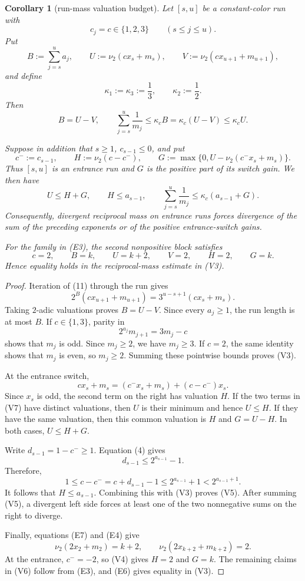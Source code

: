 \documentclass[11pt]{article}
\newtheorem{corollary}[theorem]{Corollary}
\begin{document}
\begin{corollary}[run-mass valuation budget]
Let $[s,u]$ be a constant-color run with
\[
  c_j=c\in\{1,2,3\}
  \qquad(s\leq j\leq u).
\]
Put
\[
  B:=\sum_{j=s}^{u}a_j,
  \qquad
  U:=\nu_2(cx_s+m_s),
  \qquad
  V:=\nu_2(cx_{u+1}+m_{u+1}),
  \tag{V1}
\]
and define
\[
  \kappa_1:=\kappa_3:=\frac13,
  \qquad
  \kappa_2:=\frac12.
  \tag{V2}
\]
Then
\[
\boxed{
  B=U-V,
  \qquad
  \sum_{j=s}^{u}\frac1{m_j}
  \leq\kappa_cB
  =\kappa_c(U-V)
  \leq\kappa_cU.}
\tag{V3}
\]

Suppose in addition that $s\geq1$, $c_{s-1}\leq0$, and put
\[
  c^-:=c_{s-1},
  \qquad
  H:=\nu_2(c-c^-),
  \qquad
  G:=\max\{0,U-\nu_2(c^-x_s+m_s)\}.
  \tag{V4}
\]
Thus $[s,u]$ is an entrance run and $G$ is the positive part of its
switch gain.  We then have
\[
\boxed{
  U\leq H+G,
  \qquad
  H\leq a_{s-1},
  \qquad
  \sum_{j=s}^{u}\frac1{m_j}
  \leq\kappa_c(a_{s-1}+G).}
\tag{V5}
\]
Consequently, divergent reciprocal mass on entrance runs forces divergence
of the sum of the preceding exponents or of the positive entrance-switch
gains.

For the family in (E3), the second nonpositive block satisfies
\[
  c=2,
  \qquad
  B=k,
  \qquad
  U=k+2,
  \qquad
  V=2,
  \qquad
  H=2,
  \qquad
  G=k.
  \tag{V6}
\]
Hence equality holds in the reciprocal-mass estimate in (V3).
\end{corollary}

\begin{proof}
Iteration of (11) through the run gives
\[
  2^B(cx_{u+1}+m_{u+1})
  =3^{u-s+1}(cx_s+m_s).
\]
Taking $2$-adic valuations proves $B=U-V$.  Since every $a_j\geq1$, the
run length is at most $B$.  If $c\in\{1,3\}$, parity in
\[
  2^{a_j}m_{j+1}=3m_j-c
\]
shows that $m_j$ is odd.  Since $m_j\geq2$, we have $m_j\geq3$.  If
$c=2$, the same identity shows that $m_j$ is even, so $m_j\geq2$.
Summing these pointwise bounds proves (V3).

At the entrance switch,
\[
  cx_s+m_s=(c^-x_s+m_s)+(c-c^-)x_s.
  \tag{V7}
\]
Since $x_s$ is odd, the second term on the right has valuation $H$.  If
the two terms in (V7) have distinct valuations, then $U$ is their minimum
and hence $U\leq H$.  If they have the same valuation, then this common
valuation is $H$ and $G=U-H$.  In both cases, $U\leq H+G$.

Write $d_{s-1}=1-c^-\geq1$.  Equation (4) gives
\[
  d_{s-1}\leq2^{a_{s-1}}-1.
\]
Therefore,
\[
  1\leq c-c^-=c+d_{s-1}-1\leq2^{a_{s-1}}+1<2^{a_{s-1}+1}.
\]
It follows that $H\leq a_{s-1}$.  Combining this with (V3) proves (V5).
After summing (V5), a divergent left side forces at least one of the two
nonnegative sums on the right to diverge.

Finally, equations (E7) and (E4) give
\[
  \nu_2(2x_2+m_2)=k+2,
  \qquad
  \nu_2(2x_{k+2}+m_{k+2})=2.
\]
At the entrance, $c^-=-2$, so (V4) gives $H=2$ and $G=k$.  The remaining
claims in (V6) follow from (E3), and (E6) gives equality in (V3).
\end{proof}
\end{document}
